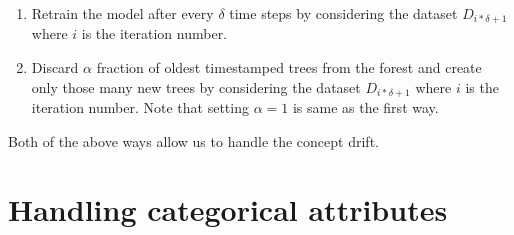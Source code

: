 \begin{enumerate}
    \item Retrain the model after every $\delta$ time steps by considering the dataset $D_{i * \delta + 1}$ where $i$ is the iteration number.
    \item Discard $\alpha$ fraction of oldest timestamped trees from the forest and create only those many new trees by considering the dataset $D_{i * \delta + 1}$ where $i$ is the iteration number. Note that setting $\alpha = 1$ is same as the first way.
\end{enumerate}

Both of the above ways allow us to handle the concept drift.


\section{Handling categorical attributes}
\label{sec:handling-categorical-attributes}

